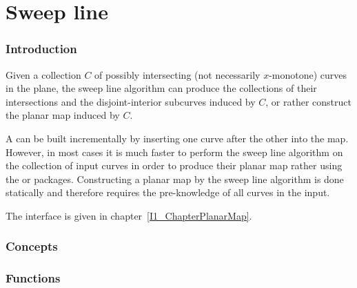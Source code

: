 \chapter{Sweep line}

\subsection*{Introduction}

Given a collection $C$ of possibly intersecting 
(not necessarily $x$-monotone) curves in the plane, 
the sweep line algorithm can produce the collections of their 
intersections and the disjoint-interior subcurves induced by $C$, or rather 
construct the planar map induced by $C$.

A  can be built incrementally by
inserting one curve after the other into the map. 
However, in most cases it is much faster to perform the sweep line algorithm on
the collection of input curves in order to produce their planar map 
rather using the  
or  packages.
Constructing a planar map by the sweep line algorithm is done statically and
therefore requires the pre-knowledge of all curves in the input.



The interface is given in chapter~\ref{I1_ChapterPlanarMap}.

\begin{ccTexOnly}

\subsection*{Concepts}

\subsection*{Functions}
\\
\\
\\
 \\
\\

\end{ccTexOnly}    

